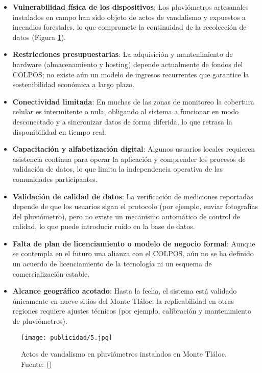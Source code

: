 \begin{itemize}
  \item \textbf{Vulnerabilidad física de los dispositivos}: Los pluviómetros artesanales instalados en campo han sido objeto de actos de vandalismo y expuestos a incendios forestales, lo que compromete la continuidad de la recolección de datos (Figura \ref{publicidad5}).  
  \item \textbf{Restricciones presupuestarias}: La adquisición y mantenimiento de hardware (almacenamiento y hosting) depende actualmente de fondos del COLPOS; no existe aún un modelo de ingresos recurrentes que garantice la sostenibilidad económica a largo plazo.  
  \item \textbf{Conectividad limitada}: En muchas de las zonas de monitoreo la cobertura celular es intermitente o nula, obligando al sistema a funcionar en modo desconectado y a sincronizar datos de forma diferida, lo que retrasa la disponibilidad en tiempo real.  
  \item \textbf{Capacitación y alfabetización digital}: Algunos usuarios locales requieren asistencia continua para operar la aplicación y comprender los procesos de validación de datos, lo que limita la independencia operativa de las comunidades participantes.  
  \item \textbf{Validación de calidad de datos}: La verificación de mediciones reportadas depende de que los usuarios sigan el protocolo (por ejemplo, enviar fotografías del pluviómetro), pero no existe un mecanismo automático de control de calidad, lo que puede introducir ruido en la base de datos.  
  \item \textbf{Falta de plan de licenciamiento o modelo de negocio formal}: Aunque se contempla en el futuro una alianza con el COLPOS, aún no se ha definido un acuerdo de licenciamiento de la tecnología ni un esquema de comercialización estable.  
  \item \textbf{Alcance geográfico acotado}: Hasta la fecha, el sistema está validado únicamente en nueve sitios del Monte Tláloc; la replicabilidad en otras regiones requiere ajustes técnicos (por ejemplo, calibración y mantenimiento de pluviómetros).  
\end{itemize}

\begin{figure}[h!]
\centering
  \texttt{[image: publicidad/5.jpg]}
  \caption{Actos de vandalismo en pluviómetros instalados en Monte Tláloc. Fuente: (\cite{Informativonacional2025})}
  \label{publicidad5}
\end{figure}



